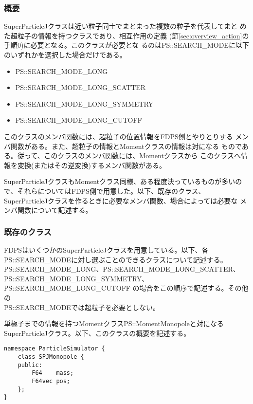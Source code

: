 \subsubsection{概要}

SuperParticleJクラスは近い粒子同士でまとまった複数の粒子を代表してまと
めた超粒子の情報を持つクラスであり、相互作用の定義
(節\ref{sec:overview_action}の手順0)に必要となる。このクラスが必要とな
るのはPS::SEARCH\_MODEに以下のいずれかを選択した場合だけである。
\begin{itemize}%
\item PS::SEARCH\_MODE\_LONG
\item PS::SEARCH\_MODE\_LONG\_SCATTER
\item PS::SEARCH\_MODE\_LONG\_SYMMETRY
\item PS::SEARCH\_MODE\_LONG\_CUTOFF
\end{itemize}
このクラスのメンバ関数には、超粒子の位置情報をFDPS側とやりとりする
メンバ関数がある。また、超粒子の情報とMomentクラスの情報は対になる
ものである。従って、このクラスのメンバ関数には、Momentクラスから
このクラスへ情報を変換(またはその逆変換)するメンバ関数がある。

SuperParticleJクラスもMomentクラス同様、ある程度決っているものが多いの
で、それらについてはFDPS側で用意した。以下、既存のクラス、
SuperParticleJクラスを作るときに必要なメンバ関数、場合によっては必要な
メンバ関数について記述する。

\subsubsection{既存のクラス}

FDPSはいくつかのSuperParticleJクラスを用意している。以下、各
PS::SEARCH\_MODEに対し選ぶことのできるクラスについて記述する。
PS::SEARCH\_MODE\_LONG、PS::SEARCH\_MODE\_LONG\_SCATTER、
PS::SEARCH\_MODE\_LONG\_SYMMETRY、PS::SEARCH\_MODE\_LONG\_CUTOFF
の場合をこの順序で記述する。その他の\\PS::SEARCH\_MODEでは超粒子を必要としない。


\label{sec:SPJMonopole}

単極子までの情報を持つMomentクラスPS::MomentMonopoleと対になる
SuperParticleJクラス。以下、このクラスの概要を記述する。
\begin{screen}
\begin{verbatim}
namespace ParticleSimulator {
    class SPJMonopole {
    public:
        F64    mass;
        F64vec pos;
    };
}
\end{verbatim}
\end{screen}

